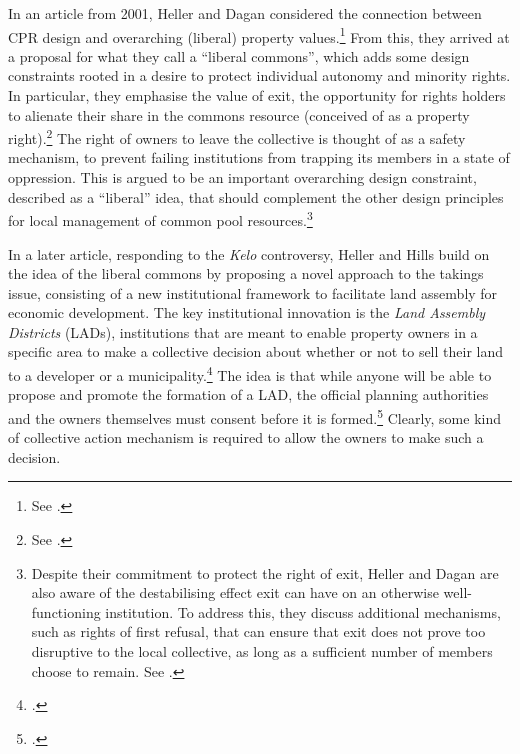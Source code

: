 In an article from 2001, Heller and Dagan considered the connection between CPR design and overarching (liberal) property values.\footnote{See \cite{heller01}.} From this, they arrived at a proposal for what they call a ``liberal commons'', which adds some design constraints rooted in a desire to protect individual autonomy and minority rights. In particular, they emphasise the value of exit, the opportunity for rights holders to alienate their share in the commons resource (conceived of as a property right).\footnote{See \cite[567-572]{heller01}.} The right of owners to leave the collective is thought of as a safety mechanism, to prevent failing institutions from trapping its members in a state of oppression. This is argued to be an important overarching design constraint, described as a ``liberal'' idea, that should complement the other design principles for local management of common pool resources.\footnote{Despite their commitment to protect the right of exit, Heller and Dagan are also aware of the destabilising effect exit can have on an otherwise well-functioning institution. To address this, they discuss additional mechanisms, such as rights of first refusal, that can ensure that exit does not prove too disruptive to the local collective, as long as a sufficient number of members choose to remain. See \cite[596-702]{heller01}.}

In a later article, responding to the {\it Kelo} controversy, Heller and Hills build on the idea of the liberal commons by proposing a novel approach to the takings issue, consisting of a new institutional framework to facilitate land assembly for economic development. The key institutional innovation is the {\it Land Assembly Districts} (LADs), institutions that are meant to enable property owners in a specific area to make a collective decision about whether or not to sell their land to a developer or a municipality.\footcite[1469-1470]{heller08} The idea is that while anyone will be able to propose and promote the formation of a LAD, the official planning authorities and the owners themselves must consent before it is formed.\footcite[1488-1489]{heller08} Clearly, some kind of collective action mechanism is required to allow the owners to make such a decision. 

